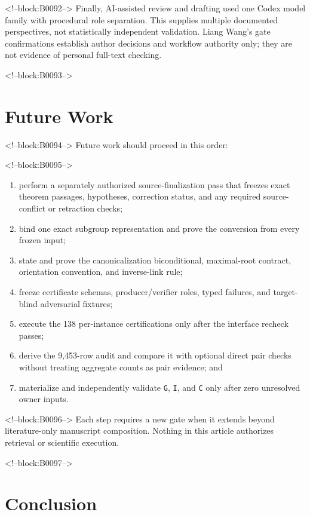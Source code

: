 \documentclass[11pt]{article}
\providecommand{\tightlist}{\setlength{\itemsep}{0pt}\setlength{\parskip}{0pt}}
\begin{document}
<!--block:B0092-->
Finally, AI-assisted review and drafting used one Codex model family
with procedural role separation. This supplies multiple documented
perspectives, not statistically independent validation. Liang Wang's
gate confirmations establish author decisions and workflow authority
only; they are not evidence of personal full-text checking.

<!--block:B0093-->
\hypertarget{9-future-work}{%
\section{Future Work}\label{9-future-work}}

<!--block:B0094-->
Future work should proceed in this order:

<!--block:B0095-->
\begin{enumerate}
\def\labelenumi{\arabic{enumi}.}
\tightlist
\item
  perform a separately authorized source-finalization pass that freezes
  exact theorem passages, hypotheses, correction status, and any
  required source-conflict or retraction checks;
\item
  bind one exact subgroup representation and prove the conversion from
  every frozen input;
\item
  state and prove the canonicalization biconditional, maximal-root
  contract, orientation convention, and inverse-link rule;
\item
  freeze certificate schemas, producer/verifier roles, typed failures,
  and target-blind adversarial fixtures;
\item
  execute the 138 per-instance certifications only after the interface
  recheck passes;
\item
  derive the 9,453-row audit and compare it with optional direct pair
  checks without treating aggregate counts as pair evidence; and
\item
  materialize and independently validate \texttt{G}, \texttt{I}, and
  \texttt{C} only after zero unresolved owner inputs.
\end{enumerate}

<!--block:B0096-->
Each step requires a new gate when it extends beyond literature-only
manuscript composition. Nothing in this article authorizes retrieval or
scientific execution.

<!--block:B0097-->
\hypertarget{10-conclusion}{%
\section{Conclusion}\label{10-conclusion}}
\end{document}

